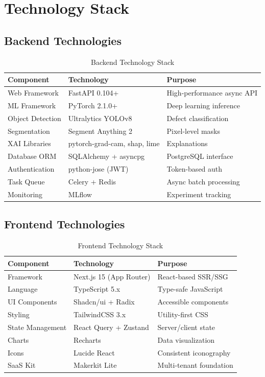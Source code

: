 \documentclass[12pt,a4paper]{report}
\begin{document}
\section{Technology Stack}

\subsection{Backend Technologies}

\begin{table}[H]
\centering
\caption{Backend Technology Stack}
\label{tab:backend_stack}
\begin{tabular}{lll}
\toprule
\textbf{Component} & \textbf{Technology} & \textbf{Purpose} \\
\midrule
Web Framework & FastAPI 0.104+ & High-performance async API \\
ML Framework & PyTorch 2.1.0+ & Deep learning inference \\
Object Detection & Ultralytics YOLOv8 & Defect classification \\
Segmentation & Segment Anything 2 & Pixel-level masks \\
XAI Libraries & pytorch-grad-cam, shap, lime & Explanations \\
Database ORM & SQLAlchemy + asyncpg & PostgreSQL interface \\
Authentication & python-jose (JWT) & Token-based auth \\
Task Queue & Celery + Redis & Async batch processing \\
Monitoring & MLflow & Experiment tracking \\
\bottomrule
\end{tabular}
\end{table}

\subsection{Frontend Technologies}

\begin{table}[H]
\centering
\caption{Frontend Technology Stack}
\label{tab:frontend_stack}
\begin{tabular}{lll}
\toprule
\textbf{Component} & \textbf{Technology} & \textbf{Purpose} \\
\midrule
Framework & Next.js 15 (App Router) & React-based SSR/SSG \\
Language & TypeScript 5.x & Type-safe JavaScript \\
UI Components & Shadcn/ui + Radix & Accessible components \\
Styling & TailwindCSS 3.x & Utility-first CSS \\
State Management & React Query + Zustand & Server/client state \\
Charts & Recharts & Data visualization \\
Icons & Lucide React & Consistent iconography \\
SaaS Kit & Makerkit Lite & Multi-tenant foundation \\
\bottomrule
\end{tabular}
\end{table}
\end{document}

